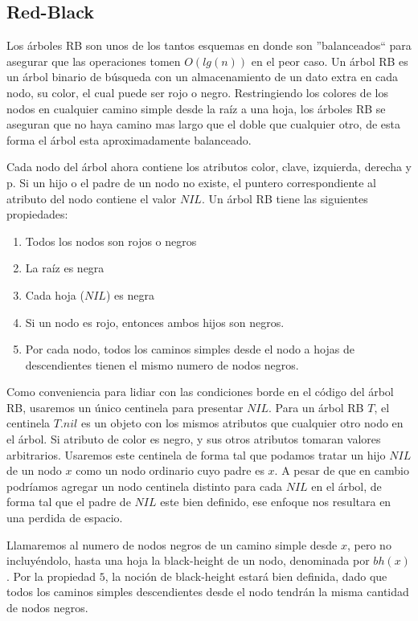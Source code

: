 \subsection{Red-Black}

Los \'arboles RB son unos de los tantos esquemas en donde son ''balanceados`` para asegurar que las operaciones tomen $O(lg(n))$ en el peor caso. Un \'arbol RB es un \'arbol binario de b\'usqueda con un almacenamiento de un dato extra en cada nodo, su color, el cual puede ser rojo o negro. Restringiendo los colores de los nodos en cualquier camino simple desde la ra\'iz a una hoja, los \'arboles RB se aseguran que no haya camino mas largo que el doble que cualquier otro, de esta forma el \'arbol esta aproximadamente balanceado.

Cada nodo del \'arbol ahora contiene los atributos color, clave, izquierda, derecha y p. Si un hijo o el padre de un nodo no existe, el puntero correspondiente al atributo del nodo contiene el valor $NIL$. Un \'arbol RB tiene las siguientes propiedades:

\begin{enumerate}
 \item Todos los nodos son rojos o negros
 \item La ra\'iz es negra
 \item Cada hoja ($NIL$) es negra
 \item Si un nodo es rojo, entonces ambos hijos son negros.
 \item Por cada nodo, todos los caminos simples desde el nodo a hojas de descendientes tienen el mismo numero de nodos negros.
\end{enumerate}

Como conveniencia para lidiar con las condiciones borde en el c\'odigo del \'arbol RB, usaremos un \'unico centinela para presentar $NIL$. Para un \'arbol RB $T$, el centinela $T.nil$ es un objeto con los mismos atributos que cualquier otro nodo en el \'arbol. Si atributo de color es negro, y sus otros atributos tomaran valores arbitrarios. Usaremos este centinela de forma tal que podamos tratar un hijo $NIL$ de un nodo $x$ como un nodo ordinario cuyo padre es $x$. A pesar de que en cambio podr\'iamos agregar un nodo centinela distinto para cada $NIL$ en el \'arbol, de forma tal que el padre de $NIL$ este bien definido, ese enfoque nos resultara en una perdida de espacio.

Llamaremos al numero de nodos negros de un camino simple desde $x$, pero no incluy\'endolo, hasta una hoja la black-height de un nodo, denominada por $bh(x)$. Por la propiedad $5$, la noci\'on de black-height estar\'a bien definida, dado que todos los caminos simples descendientes desde el nodo tendr\'an la misma cantidad de nodos negros.

